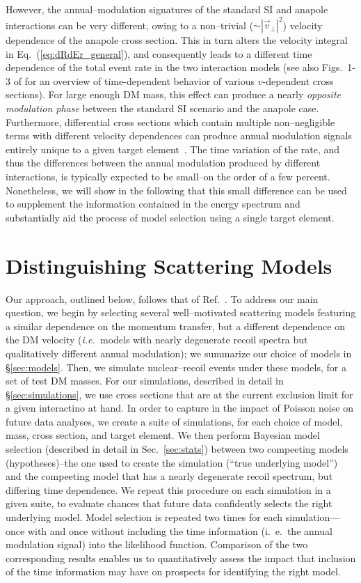 \documentclass[11pt]{article}
\newcommand{\ie}{{\it i.e.~}}  \newcommand{\eg}{{\it e.g.~}}
\newcommand{\Eq}[1]{Eq.~(\ref{#1})} \newcommand{\Eqs}[2]{Eqs.~(\ref{#1}) and (\ref{#2})} \newcommand{\Eqm}[2]{Eqs.~(\ref{#1}) through (\ref{#2})}
\newcommand{\Sec}[1]{Sec.~\ref{#1}} \newcommand{\Secs}[2]{Secs.~\ref{#1} and \ref{#2}} \newcommand{\Secm}[2]{Secs.~\ref{#1} through \ref{#2}}
\begin{document}
However, the annual--modulation signatures of the standard SI and anapole interactions can be very different, owing to a non--trivial ($\sim | \vec v_\perp|^2$) velocity dependence of the anapole cross section. This in turn alters the velocity integral in \Eq{eq:dRdEr_general}, and consequently leads to a different time dependence of the total event rate in the two interaction models (see also Figs.~1-3 of \cite{DelNobile:2015rmp} for an overview of time-dependent behavior of various $v$-dependent cross sections). For large enough DM mass, this effect can produce a nearly {\it opposite modulation phase} between the standard SI scenario and the anapole case. Furthermore, differential cross sections which contain multiple non--negligible terms with different velocity dependences can produce annual modulation signals entirely unique to a given target element~\cite{DelNobile:2015tza,DelNobile:2015rmp}. The time variation of the rate, and thus the differences between the annual modulation produced by different interactions, is typically expected to be small--on the order of a few percent. Nonetheless, we will show in the following that this small difference can be used to supplement the information contained in the energy spectrum and substantially aid the process of model selection using a single target element. 

\section{Distinguishing Scattering Models}\label{sec:procedure}
Our approach, outlined below, follows that of Ref.~\cite{Gluscevic:2015sqa}. To address our main question, we begin by selecting several well--motivated scattering models featuring a similar dependence on the momentum transfer, but a different dependence on the DM velocity (\ie models with nearly degenerate recoil spectra but qualitatively different annual modulation); we summarize our choice of models in \S\ref{sec:models}. Then, we simulate nuclear--recoil events under these models, for a set of test DM masses. For our simulations, described in detail in \S\ref{sec:simulations}, we use cross sections that are at the current exclusion limit for a given interactino at hand. In order to capture in the impact of Poisson noise on future data analyses, we create a suite of simulations, for each choice of model, mass, cross section, and target element. We then perform Bayesian model selection (described in detail in \Sec{sec:stats}) between two compeeting models (hypotheses)--the one used to create the simulation (``true underlying model'') and the compeeting model that has a nearly degenerate recoil spectrum, but differing time dependence.  We repeat this procedure on each simulation in a given suite, to evaluate chances that future data confidently selects the right underlying model. Model selection is repeated two times for each simulation---once with and once without including the time information (i.~e.~the annual modulation signal) into the likelihood function. Comparison of the two corresponding results enables us to quantitatively assess the impact that inclusion of the time information may have on prospects for identifying the right model. 
 
\end{document}
